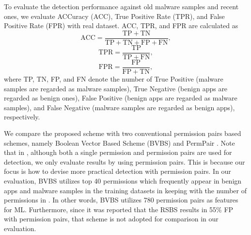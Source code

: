 \documentclass{ieeeaccess}
\begin{document}
To evaluate the detection performance against old malware samples and recent ones, we evaluate ACCuracy (ACC), True Positive Rate (TPR), and False Positive Rate (FPR) with real dataset.
ACC, TPR, and FPR are calculated as
\begin{equation}
  \mathrm{ACC} = \frac{\mathrm{TP}+\mathrm{TN}}{\mathrm{TP} + \mathrm{TN} + \mathrm{FP} + \mathrm{FN}}, 
\end{equation}
\begin{equation}
  \mathrm{TPR} = \frac{\mathrm{TP}}{\mathrm{TP + FN}},
\end{equation}
\begin{equation}
  \mathrm{FPR} = \frac{\mathrm{FP}}{\mathrm{FP + TN}},
\end{equation}
where TP, TN, FP, and FN denote the number of True Positive (malware samples are regarded as malware samples), True Negative (benign apps are regarded as benign ones), False Positive (benign apps are regarded as malware samples), and False Negative (malware samples are regarded as benign apps), respectively.  

We compare the proposed scheme with two conventional permission pairs based schemes, namely Boolean Vector Based Scheme (BVBS) \cite{liu2014two} and PermPair \cite{arora2019permpair}.
Note that in \cite{liu2014two}, although both a single permission and permission pairs are used for detection, we only evaluate results by using permission pairs.
This is because our focus is how to devise more practical detection with permission pairs.
In our evaluation, BVBS utilizes top 40 permissions which frequently appear in benign apps and malware samples in the training datasets in keeping with the number of permissions in \cite{liu2014two}.
In other words, BVBS utilizes 780 permission pairs as features for ML.
Furthermore, since it was reported that the RSBS \cite{liang2014permission} results in 55\% FP with permission pairs, that scheme is not adopted for comparison in our evaluation.
\end{document}
